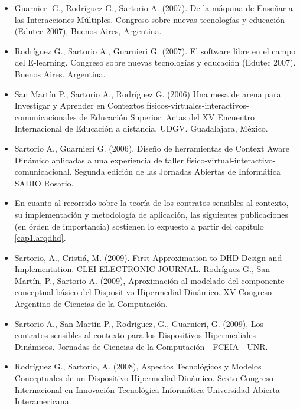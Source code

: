 \begin{itemize}
 \item 
Guarnieri G., Rodríguez G., Sartorio A. (2007). De la máquina de Enseñar
a las Interacciones Múltiples. Congreso sobre nuevas tecnologías y educación
(Edutec 2007), Buenos Aires, Argentina.

\item
Rodríguez G., Sartorio A., Guarnieri G. (2007). El software libre en el
campo del E-learning. Congreso sobre nuevas tecnologías y educación (Edutec
2007). Buenos Aires. Argentina.

\item
San Martín P., Sartorio A., Rodríguez G. (2006) Una mesa de arena para
Investigar y Aprender en
Contextos físicos-virtuales-interactivos-comunicacionales de Educación Superior.
Actas del XV Encuentro Internacional de Educación a distancia. UDGV.
Guadalajara, México.

\item
Sartorio A., Guarnieri G. (2006), Diseño de herramientas de Context Aware
Dinámico aplicadas a una experiencia de
taller físico-virtual-interactivo-comunicacional. Segunda edición de las
Jornadas Abiertas de Informática SADIO Rosario.

\item
En cuanto al recorrido sobre la teoría de los contratos sensibles al contexto,
su implementación y metodología de aplicación, las siguientes publicaciones (en
órden de importancia) sostienen lo expuesto a partir del
capítulo \ref{cap1.arqdhd}.

\item
Sartorio, A., Cristiá, M. (2009). First Approximation to DHD Design and
Implementation. CLEI ELECTRONIC JOURNAL.
Rodríguez G., San Martín, P., Sartorio A. (2009), Aproximación al modelado del
componente conceptual básico del Dispositivo Hipermedial Dinámico. XV Congreso
Argentino de Ciencias de la Computación.  

\item
Sartorio A., San Martín P., Rodriguez, G., Guarnieri, G. (2009), Los contratos
sensibles al contexto para los Dispositivos Hipermediales Dinámicos. Jornadas de
Ciencias de la Computación - FCEIA - UNR.

\item
Rodríguez G., Sartorio, A. (2008), Aspectos Tecnológicos y
Modelos Conceptuales de un Dispositivo Hipermedial Dinámico. Sexto
Congreso Internacional en Innovación Tecnológica Informática Universidad
Abierta Interamericana.


\end{itemize}
